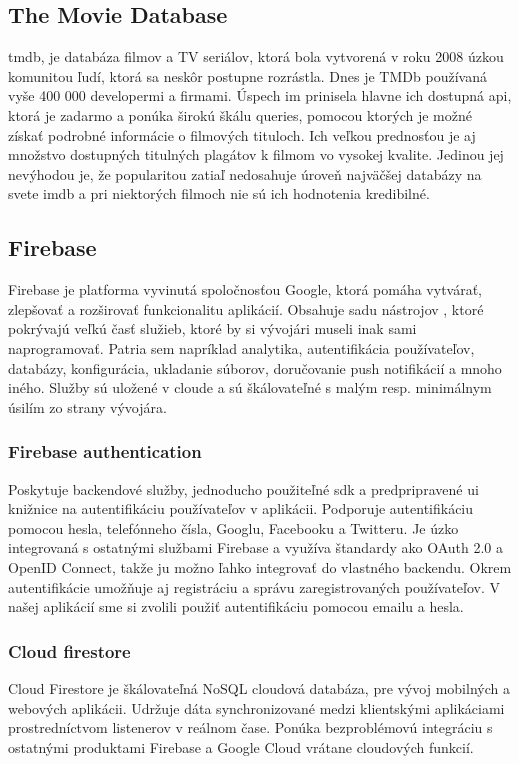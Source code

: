\subsection{The Movie Database}
 \acrfull{tmdb}, je databáza filmov a TV seriálov, ktorá bola vytvorená v roku 2008 úzkou komunitou ľudí, ktorá sa neskôr postupne rozrástla. Dnes je TMDb používaná vyše 400 000 developermi a firmami. Úspech im prinisela hlavne ich dostupná \acrshort{api}, ktorá je zadarmo a ponúka širokú škálu queries, pomocou ktorých je možné získať podrobné informácie o filmových tituloch. Ich veľkou prednosťou je aj množstvo dostupných titulných plagátov k filmom vo vysokej kvalite. Jedinou jej nevýhodou je, že popularitou zatiaľ nedosahuje úroveň najväčšej databázy na svete \acrshort{imdb} a pri niektorých filmoch nie sú ich hodnotenia kredibilné. \\

\subsection{Firebase}
Firebase je platforma vyvinutá spoločnosťou Google, ktorá pomáha vytvárať, zlepšovať a rozširovať funkcionalitu aplikácií. Obsahuje sadu nástrojov , ktoré pokrývajú veľkú časť služieb, ktoré by si vývojári museli inak sami naprogramovať. Patria sem napríklad analytika, autentifikácia používateľov, databázy, konfigurácia, ukladanie súborov, doručovanie push notifikácií a mnoho iného. Služby sú uložené v cloude a sú škálovateľné s malým resp. minimálnym úsilím zo strany vývojára. \\

\subsubsection{Firebase authentication}
\label{sec:firebaseauth}
Poskytuje backendové služby, jednoducho použiteľné \acrshort{sdk} a predpripravené \acrshort{ui} knižnice na autentifikáciu používateľov v aplikácii. Podporuje autentifikáciu pomocou hesla, telefónneho čísla, Googlu, Facebooku a Twitteru. Je úzko integrovaná s ostatnými službami Firebase a využíva  štandardy ako OAuth 2.0 a OpenID Connect, takže ju možno ľahko integrovať do vlastného backendu. Okrem autentifikácie umožňuje aj registráciu a správu zaregistrovaných používateľov. V našej aplikácií sme si zvolili použiť autentifikáciu pomocou emailu a hesla. \\

\subsubsection{Cloud firestore}
\label{sec:firestore}
Cloud Firestore je škálovateľná NoSQL cloudová databáza, pre vývoj mobilných a webových aplikácii. Udržuje dáta synchronizované medzi klientskými aplikáciami prostredníctvom listenerov v reálnom čase. Ponúka bezproblémovú integráciu s ostatnými produktami Firebase a Google Cloud vrátane cloudových funkcií. 

